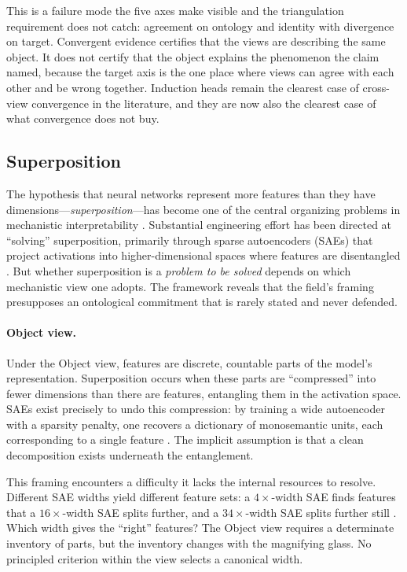 \documentclass{article}
\begin{document}
This is a failure mode the five axes make visible and the triangulation
requirement does not catch: agreement on ontology and identity with
divergence on target.  Convergent evidence certifies that the views are
describing the same object.  It does not certify that the object explains
the phenomenon the claim named, because the target axis is the one place
where views can agree with each other and be wrong together.  Induction
heads remain the clearest case of cross-view convergence in the
literature, and they are now also the clearest case of what convergence
does not buy.

\subsection{Superposition}
\label{sec:worked-superposition}

The hypothesis that neural networks represent more features than they have dimensions---\emph{superposition}---has become one of the central organizing problems in mechanistic interpretability \citep{elhage2022superposition}. Substantial engineering effort has been directed at ``solving'' superposition, primarily through sparse autoencoders (SAEs) that project activations into higher-dimensional spaces where features are disentangled \citep{bricken2023, templeton2024}. But whether superposition is a \emph{problem to be solved} depends on which mechanistic view one adopts. The framework reveals that the field's framing presupposes an ontological commitment that is rarely stated and never defended.

\paragraph{Object view.}
Under the Object view, features are discrete, countable parts of the model's representation. Superposition occurs when these parts are ``compressed'' into fewer dimensions than there are features, entangling them in the activation space. SAEs exist precisely to undo this compression: by training a wide autoencoder with a sparsity penalty, one recovers a dictionary of monosemantic units, each corresponding to a single feature \citep{bricken2023}. The implicit assumption is that a clean decomposition exists underneath the entanglement.

This framing encounters a difficulty it lacks the internal resources to resolve. Different SAE widths yield different feature sets: a $4\times$-width SAE finds features that a $16\times$-width SAE splits further, and a $34\times$-width SAE splits further still \citep{templeton2024}. Which width gives the ``right'' features? The Object view requires a determinate inventory of parts, but the inventory changes with the magnifying glass. No principled criterion within the view selects a canonical width.
\end{document}
